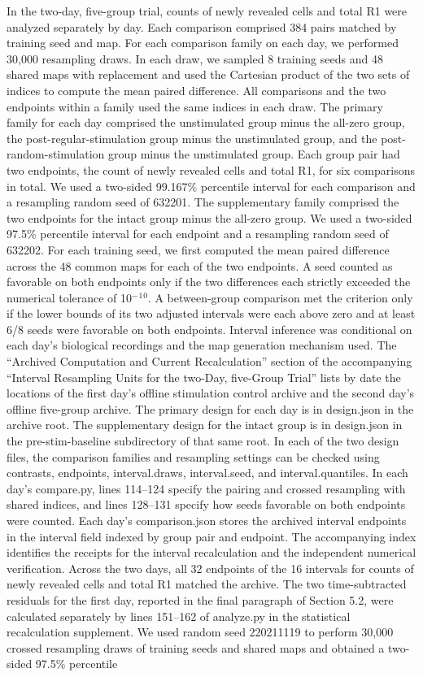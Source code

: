 \documentclass{article}
\begin{document}
In the two-day, five-group trial, counts of newly revealed cells and total R1 were analyzed separately by day. Each comparison comprised 384 pairs matched by training seed and map. For each comparison family on each day, we performed 30,000 resampling draws. In each draw, we sampled 8 training seeds and 48 shared maps with replacement and used the Cartesian product of the two sets of indices to compute the mean paired difference. All comparisons and the two endpoints within a family used the same indices in each draw. The primary family for each day comprised the unstimulated group minus the all-zero group, the post-regular-stimulation group minus the unstimulated group, and the post-random-stimulation group minus the unstimulated group. Each group pair had two endpoints, the count of newly revealed cells and total R1, for six comparisons in total. We used a two-sided 99.167\% percentile interval for each comparison and a resampling random seed of 632201. The supplementary family comprised the two endpoints for the intact group minus the all-zero group. We used a two-sided 97.5\% percentile interval for each endpoint and a resampling random seed of 632202. For each training seed, we first computed the mean paired difference across the 48 common maps for each of the two endpoints. A seed counted as favorable on both endpoints only if the two differences each strictly exceeded the numerical tolerance of 10\ensuremath{{}^{-}}\ensuremath{{}^{1}}\ensuremath{{}^{0}}. A between-group comparison met the criterion only if the lower bounds of its two adjusted intervals were each above zero and at least 6/8 seeds were favorable on both endpoints. Interval inference was conditional on each day's biological recordings and the map generation mechanism used. The “Archived Computation and Current Recalculation” section of the accompanying “Interval Resampling Units for the two-Day, five-Group Trial” lists by date the locations of the first day's offline stimulation control archive and the second day's offline five-group archive. The primary design for each day is in design.json in the archive root. The supplementary design for the intact group is in design.json in the pre-stim-baseline subdirectory of that same root. In each of the two design files, the comparison families and resampling settings can be checked using contrasts, endpoints, interval.draws, interval.seed, and interval.quantiles. In each day's compare.py, lines 114--124 specify the pairing and crossed resampling with shared indices, and lines 128--131 specify how seeds favorable on both endpoints were counted. Each day's comparison.json stores the archived interval endpoints in the interval field indexed by group pair and endpoint. The accompanying index identifies the receipts for the interval recalculation and the independent numerical verification. Across the two days, all 32 endpoints of the 16 intervals for counts of newly revealed cells and total R1 matched the archive. The two time-subtracted residuals for the first day, reported in the final paragraph of Section 5.2, were calculated separately by lines 151--162 of analyze.py in the statistical recalculation supplement. We used random seed 220211119 to perform 30,000 crossed resampling draws of training seeds and shared maps and obtained a two-sided 97.5\% percentile 
\end{document}
